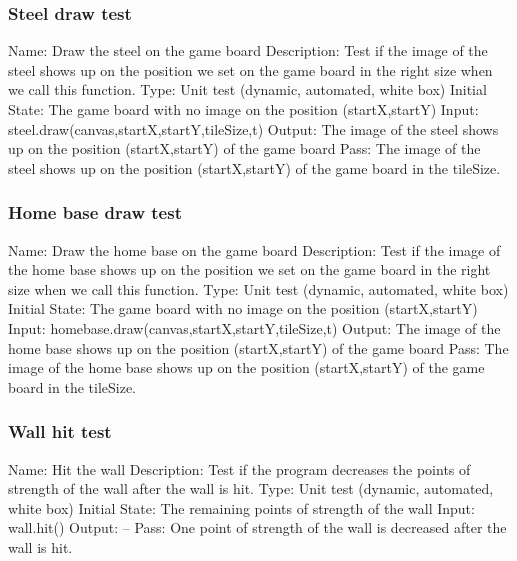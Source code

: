 \documentclass{article}
\begin{document}
\subsubsection{Steel draw test}
Name:  Draw the steel on the game board\newline
Description: Test if the image of the steel shows up on the position we set on the game board in the right size when we call this function. \newline
Type: Unit test (dynamic, automated, white box) \newline
Initial State:  The game board with no image on the position (startX,startY) \newline
Input: steel.draw(canvas,startX,startY,tileSize,t)\newline
Output: The image of the steel shows up on the position (startX,startY) of the game board\newline
Pass:  The image of the steel shows up on the position (startX,startY) of the game board in the tileSize. \newline

\subsubsection{Home base draw test}
Name:  Draw the home base on the game board\newline
Description: Test if the image of the home base shows up on the position we set on the game board in the right size when we call this function. \newline
Type: Unit test (dynamic, automated, white box) \newline
Initial State:  The game board with no image on the position (startX,startY) \newline
Input: homebase.draw(canvas,startX,startY,tileSize,t)\newline
Output: The image of the home base shows up on the position (startX,startY) of the game board\newline
Pass:  The image of the home base shows up on the position (startX,startY) of the game board in the tileSize. \newline

\subsubsection{Wall hit test}
Name:  Hit the wall\newline
Description: Test if the program decreases the points of strength of the wall after the wall is hit. \newline
Type: Unit test (dynamic, automated, white box) \newline
Initial State:  The remaining points of strength of the wall\newline
Input: wall.hit()\newline
Output: --\newline
Pass:  One point of strength of the wall is decreased after the wall is hit. \newline
\end{document}

